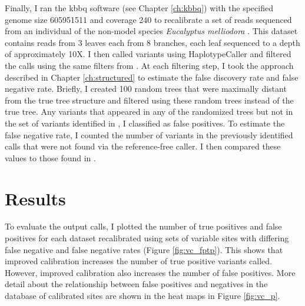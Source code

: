 \documentclass{report}
\begin{document}
\begin{outline}
\item Finally, I ran the kbbq software (see Chapter \ref{ch:kbbq}) with the specified genome size 605951511 and coverage 240 to recalibrate a set of reads sequenced from an individual of the non-model species \textit{Eucalyptus melliodora} \parencite{orr_phylogenomic_2020}. This dataset contains reads from 3 leaves each from 8 branches, each leaf sequenced to a depth of approximately 10X. I then called variants using HaplotypeCaller and filtered the calls using the same filters from \cite{orr_phylogenomic_2020}. At each filtering step, I took the approach described in Chapter \ref{ch:structured} to estimate the false discovery rate and false negative rate. Briefly, I created 100 random trees that were maximally distant from the true tree structure and filtered using these random trees instead of the true tree. Any variants that appeared in any of the randomized trees but not in the set of variants identified in \cite{orr_phylogenomic_2020}, I classified as false positives. To estimate the false negative rate, I counted the number of variants in the previously identified calls that were not found via the reference-free caller. I then compared these values to those found in \cite{orr_phylogenomic_2020}.

\end{outline}

\section{Results}
\begin{outline}
\item To evaluate the output calls, I plotted the number of true positives and false positives for each dataset recalibrated using sets of variable sites with differing false negative and false negative rates (Figure \ref{fig:vc_fptp}). This shows that improved calibration increases the number of true positive variants called. However, improved calibration also increases the number of false positives. More detail about the relationship between false positives and negatives in the database of calibrated sites are shown in the heat maps in Figure \ref{fig:vc_p}.
\end{outline}
\end{document}

